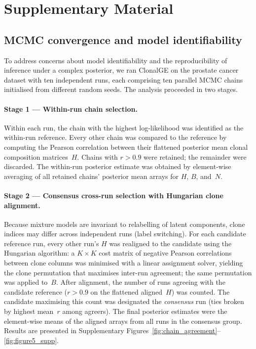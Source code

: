 \documentclass[unnumsec,webpdf,contemporary,large]{oup-authoring-template}%
\theoremstyle{thmstyleone}%
\theoremstyle{thmstyletwo}%
\theoremstyle{thmstylethree}%
\begin{document}
\section*{Supplementary Material}

\subsection*{MCMC convergence and model identifiability}

To address concerns about model identifiability and the reproducibility of
inference under a complex posterior, we ran ClonalGE on the prostate cancer
dataset with ten independent runs, each comprising ten parallel MCMC chains
initialised from different random seeds.
The analysis proceeded in two stages.

\paragraph{Stage 1 --- Within-run chain selection.}
Within each run, the chain with the highest log-likelihood was identified as
the within-run reference.
Every other chain was compared to the reference by computing the Pearson
correlation between their flattened posterior mean clonal composition
matrices~$H$.  Chains with $r>0.9$ were retained; the remainder were
discarded.  The within-run posterior estimate was obtained by element-wise
averaging of all retained chains' posterior mean arrays for $H$, $B$,
and~$N$.

\paragraph{Stage 2 --- Consensus cross-run selection with Hungarian clone
alignment.}
Because mixture models are invariant to relabelling of latent components,
clone indices may differ across independent runs (label switching).
For each candidate reference run, every other run's $H$ was realigned to
the candidate using the Hungarian algorithm: a $K\times K$ cost matrix of
negative Pearson correlations between clone columns was minimised with a
linear assignment solver, yielding the clone permutation that maximises
inter-run agreement; the same permutation was applied to~$B$.
After alignment, the number of runs agreeing with the candidate reference
($r>0.9$ on the flattened aligned~$H$) was counted.  The candidate
maximising this count was designated the \emph{consensus} run (ties broken
by highest mean~$r$ among agreers).  The final posterior estimates were
the element-wise means of the aligned arrays from all runs in the
consensus group.
Results are presented in
Supplementary Figures~\ref{fig:chain_agreement}--\ref{fig:figure5_supp}.
\end{document}
